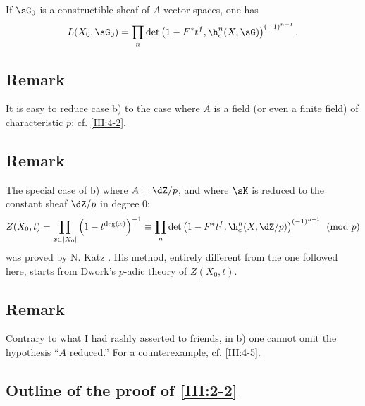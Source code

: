If $\sG_0$ is a constructible sheaf of $A$-vector spaces, one has
\[
  L(X_0,\sG_0) = \prod_n \det\left(1-F^* t^f,\h_c^n(X,\sG)\right)^{(-1)^{n+1}} \text{.}
\]






\subsection{Remark}\label{III:2-5}

It is easy to reduce case b) to the case where $A$ is a field (or even a
finite field) of characteristic $p$; cf. \ref{III:4-2}.






\subsection{Remark}\label{III:2-6}

The special case of b) where $A=\dZ/p$, and where $\sK$ is reduced to the
constant sheaf $\dZ/p$ in degree $0$:
\[
  Z(X_0,t) = \prod_{x\in |X_0|} \left(1-t^{\deg(x)}\right)^{-1}
      \equiv \prod_n \det\left(1-F^* t^f,\h_c^n(X,\dZ/p)\right)^{(-1)^{n+1}} \pmod p
\]
was proved by N. Katz \cite[XXII 3.1]{sga7}. His method, entirely different
from the one followed here, starts from Dwork's $p$-adic theory of
$Z(X_0,t)$.






\subsection{Remark}\label{III:2-7}


Contrary to what I had rashly asserted to friends, in b) one cannot omit the
hypothesis ``$A$ reduced.'' For a counterexample, cf. \ref{III:4-5}.






\subsection{Outline of the proof of \ref{III:2-2}}\label{III:2-8}

